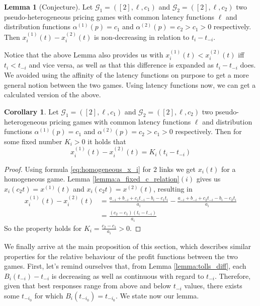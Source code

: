 \documentclass[10pt,a4paper]{book}
\newcommand{\Gm}{\mathcal{G}}
\theoremstyle{definition}
\newtheorem{lemma}[definition]{Lemma}
\newtheorem{corollary}[definition]{Corollary}
\theoremstyle{comment}
\begin{document}
\begin{lemma}[Conjecture]
	\label{lemma:a_fixed_x12}
	Let $\Gm_1 = ([2], \ell, c_1)$ and $\Gm_2 = ([2], \ell, c_2)$ two pseudo-heterogeneous pricing games with common latency functions $\ell$ and distribution functions $\alpha^{(1)}(p) = c_1$ and $\alpha^{(2)}(p) = c_2 > c_1 > 0$ respectively.
	Then $x_i^{(1)}(t) - x_i^{(2)}(t)$ is non-decreasing in relation to $t_i - t_{-i}$.
\end{lemma}
Notice that the above Lemma also provides us with $x_i^{(1)}(t) < x_i^{(2)}(t)$ iff $t_i < t_{-i}$ and vice versa, as well as that this difference is expanded as $t_i - t_{-i}$ does.
We avoided using the affinity of the latency functions on purpose to get a more general notion between the two games.
Using latency functions now, we can get a calculated version of the above.
\begin{corollary}
	\label{corollary:a_fixed_x12_calc}
	Let $\Gm_1 = ([2], \ell, c_1)$ and $\Gm_2 = ([2], \ell, c_2)$ two pseudo-heterogeneous pricing games with common latency functions $\ell$ and distribution functions $\alpha^{(1)}(p) = c_1$ and $\alpha^{(2)}(p) = c_2 > c_1 > 0$ respectively.
	Then for some fixed number $K_i > 0$ it holds that
	\[x_i^{(1)}(t) - x_i^{(2)}(t) = K_i (t_i - t_{-i})\]
\end{corollary}

\begin{proof}
	Using formula \ref{eq:homogeneous_x_i} for $2$ links we get $x_i(t)$ for a homogeneous game.
	Lemma \ref{lemma:a_fixed_c_relation}$(i)$ gives us $x_i(c_2 t) = x^{(1)}(t)$ and $x_i(c_2 t) = x^{(2)}(t)$, resulting in
	\begin{align*}
		x_i^{(1)}(t) - x_i^{(2)}(t) &= \frac{a_{-i} + b_{-i} + c_1t_{-i} - b_i - c_1t_i}{a_i} - \frac{a_{-i} + b_{-i} + c_2t_{-i} - b_i - c_2t_i}{a_i} \\
		&= \frac{(c_2 - c_1)(t_i - t_{-i})}{a_i}
	\end{align*}
	So the property holds for $K_i = \frac{c_2 - c_1}{a_i} > 0$.
\end{proof}

We finally arrive at the main proposition of this section, which describes similar properties for the relative behaviour of the profit functions between the two games.
First, let's remind ourselves that, from Lemma \ref{lemma:tolls_diff}, each $B_i(t_{-i}) - t_{-i}$ is decreasing as well as continuous with regard to $t_{-i}$.
Therefore, given that best responses range from above and below $t_{-i}$ values, there exists some $t_{-i_0}$ for which $B_i(t_{-i_0}) = t_{-i_0}$.
We state now our lemma.
\end{document}
